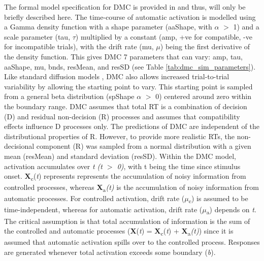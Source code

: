 The formal model specification for DMC is provided in
\textcite{ulrich2015automatic} and thus, will only be briefly described here.
The time-course of automatic activation is modelled using a Gamma density
function with a shape parameter (aaShape, with $\alpha$ $>$ 1) and a scale
parameter (tau, $\tau$) multiplied by a constant (amp, +ve for compatible, -ve
for incompatible trials), with the drift rate (mu, $\mu$) being the first
derivative of the density function. This gives DMC 7 parameters that can vary:
amp, tau, aaShape, mu, bnds, resMean, and resSD (see Table \ref{tab:dmc_sim_parameters}).
Like standard diffusion models \parencite[see][]{ratcliff2013parameter}, DMC
also allows increased trial-to-trial variability by allowing the starting point
to vary. This starting point is sampled from a general beta distribution
(spShape $\alpha$ $>$ 0) centered around zero within the boundary range. DMC
assumes that total RT is a combination of decision (D) and residual
non-decision (R) processes and assumes that compatibility effects influence D
processes only. The predictions of DMC are independent of the distributional
properties of R. However, to provide more realistic RTs, the non-decisional
component (R) was sampled from a normal distribution with a given mean
(resMean) and standard deviation (resSD). Within the DMC model, activation
accumulates over \textit{t (t $>$ 0)}, with t being the time since stimulus
onset. \textbf{X}\textsubscript{c}(\textit{t}) represents represents the
accumulation of noisy information from controlled processes, whereas
\textbf{X}\textsubscript{a}\textit{(t)} is the accumulation of noisy
information from automatic processes. For controlled activation, drift rate
(\textit{$\mu$}\textsubscript{c}) is assumed to be time-independent, whereas
for automatic activation, drift rate (\textit{$\mu$}\textsubscript{a}) depends
on \textit{t}. The critical assumption is that total accumulation of
information is the sum of the controlled and automatic processes
(\textbf{X}(\textit{t}) = \textbf{X}\textsubscript{c}(\textit{t}) +
\textbf{X}\textsubscript{a}\textit{(t)}) since it is assumed that automatic
activation spills over to the controlled process. Responses are generated
whenever total activation exceeds some boundary (\textit{b}). 

